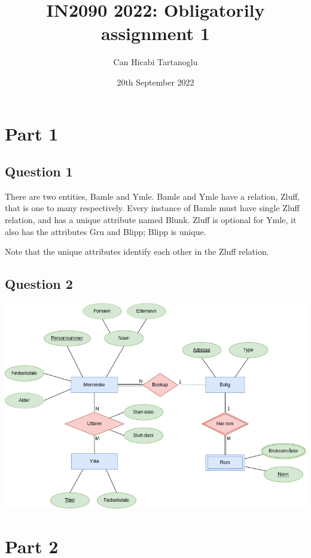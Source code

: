 \documentclass[]{article}
\title{IN2090 2022: Obligatorily assignment 1}
\author{Can Hicabi Tartanoglu}
\date{20th September 2022}
\begin{document}
\maketitle

\section*{Part 1}

\subsection*{Question 1}

There are two entities, Bamle and Ymle. Bamle and Ymle have a relation, Zluff, that is one to many respectively. Every instance of Bamle must have single Zluff relation, and has a unique attribute named Blunk. Zluff is optional for Ymle, it also has the attributes Gru and Blipp; Blipp is unique.

Note that the unique attributes identify each other in the Zluff relation.


\subsection*{Question 2}
\includegraphics[width=\textwidth]{figures/fig_q2.png}


\section*{Part 2}
\end{document}
